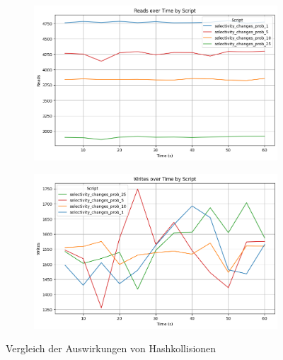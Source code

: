 \vspace{-4pt}
\begin{figure}[H]
    \centering
    \begin{subfigure}[t]{0.48\textwidth}
        \centering
        \includegraphics[width=\textwidth]{PNGs/Script/Index/Hash/hash-selectivity-change/Reads}
    \end{subfigure}
    \hfill
    \begin{subfigure}[t]{0.48\textwidth}
        \centering
        \includegraphics[width=\textwidth]{PNGs/Script/Index/Hash/hash-selectivity-change/Writes}
    \end{subfigure}
    \vspace{-8pt}
    \caption[Hash-Indexing: Auswirkungen von Hashkollisionen]{Vergleich der Auswirkungen von Hashkollisionen}
    \label{fig:hash-collision-comparison}
\end{figure}
\vspace{-17pt}

